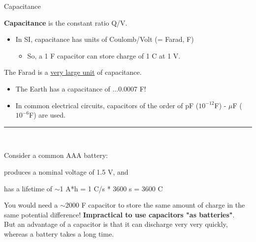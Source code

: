 %
%
%

\begin{frame}{Capacitance}

{\bf Capacitance} is the constant ratio Q/V.\\

\begin{itemize}
  \item In SI, capacitance has units of Coulomb/Volt (= Farad, F)\\
  \begin{itemize}
     \item So, a 1 F capacitor can store charge of 1 C at 1 V.
  \end{itemize}
\end{itemize}

The Farad is a \underline{very large unit} of capacitance.
\begin{itemize}
  \item The Earth has a capacitance of ...0.0007 F!
  \item In common electrical circuits,
        capacitors of the order of pF ($10^{-12}$F) - $\mu$F ($10^{-6}$F) are used.
\end{itemize}

\noindent\rule{2cm}{0.4pt}\\
{\scriptsize
  Consider a common AAA battery:
  \begin{itemize}
  {\small
    \item produces a nominal voltage of 1.5 V, and
    \item has a lifetime of $\sim$1 A*h = 1 C/s * 3600 s = 3600 C
  }
  \end{itemize}
  You would need a $\sim$2000 F capacitor to store
  the same amount of charge in the same potential difference!
  {\bf Impractical to use capacitors "as batteries"}.\\
  But an advantage of a capacitor is that it can discharge very very quickly,
  whereas a battery takes a long time.\\
}

\end{frame}

%
%
%

